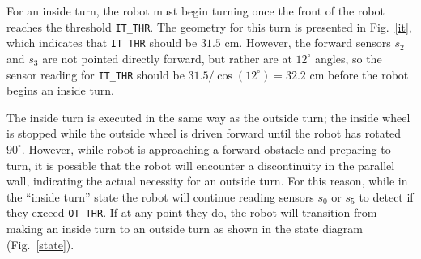 \begin{figure}[h!]
\centering
\cprotect {}
\end{figure}
For an inside turn, the robot must begin turning once the front of the
robot reaches the threshold \verb+IT_THR+. The geometry for this turn is
presented in Fig.~\ref{it}, which indicates that \verb+IT_THR+ should
be \(31.5\) cm. However, the forward sensors \(s_2\) and \(s_3\) are
not pointed directly forward, but rather are at \(12^\circ\) angles,
so the sensor reading for \verb+IT_THR+ should be
\(31.5/\cos(12^\circ)=32.2\) cm before the robot begins an inside
turn. 

The inside turn is executed in the same way as the outside turn;
the inside wheel is stopped while the outside wheel is driven forward
until the robot has rotated \(90^\circ\). However, while robot is
approaching a forward obstacle and preparing to turn, it is possible
 that the robot will encounter a discontinuity in the
parallel wall, indicating the actual necessity for an outside
turn. For this reason, while in the ``inside turn'' state the robot will
continue reading sensors \(s_0\) or \(s_5\) to detect if they exceed
\verb+OT_THR+. If at any point they do, the robot will transition from
making an inside turn to an outside turn as shown in the state
diagram (Fig.~\ref{state}).
